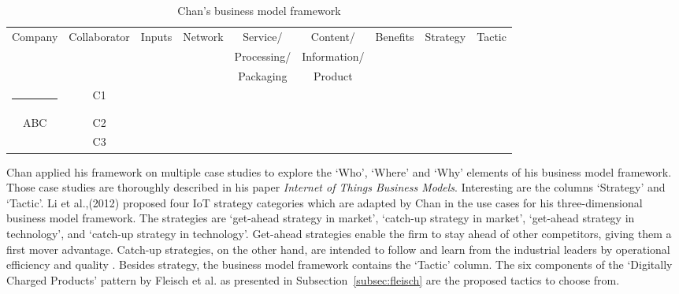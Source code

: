 		\begin{table}[h!]
			\scriptsize
			\centering			
			\caption{Chan's business model framework \cite{chan}}
			\label{tab:chan}
			\centering
			\vspace{0.2cm}
			               
		\begin{tabular}{ccccccccc} \hline
			\rule{0pt}{8pt}

			Company &Collaborator  & Inputs & Network & Service/ & Content/ & Benefits & Strategy & Tactic\rule{0pt}{8pt} \\
			&&&&Processing/ & Information/ \\
			&&&&Packaging & Product\\	\hline \rule{-2pt}{8pt}
			&C1\\
			ABC&C2\\
			&C3\\ \hline		
		\end{tabular}
		\end{table}

		Chan applied his framework on multiple case studies to explore the `Who', `Where' and `Why' elements of his business model framework. Those case studies are thoroughly described in his paper \emph{Internet of Things Business Models}\cite{chan}. Interesting are the columns `Strategy' and `Tactic'. Li et al.,(2012) \cite{li} proposed four IoT strategy categories which are adapted by Chan in the use cases for his three-dimensional business model framework. The strategies are `get-ahead strategy in market', `catch-up strategy in market', `get-ahead strategy in technology', and `catch-up strategy in technology'. Get-ahead strategies enable the firm to stay ahead of other competitors, giving them a first mover advantage. Catch-up strategies, on the other hand, are intended to follow and learn from the industrial leaders by operational efficiency and quality \cite{chan}.
		Besides strategy, the business model framework contains the `Tactic' column. The six components of the `Digitally Charged Products' pattern by Fleisch et al. \cite{fleisch} as presented in Subsection~\ref{subsec:fleisch} are the proposed tactics to choose from.
%
